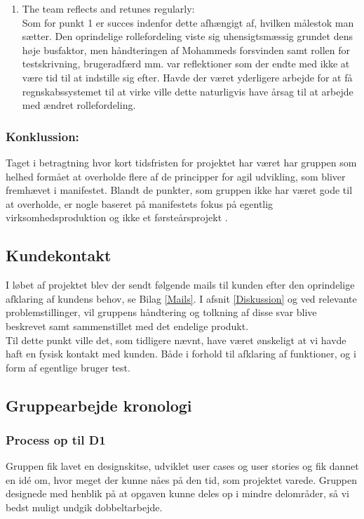 \documentclass[]{article}
\begin{document}
\begin{enumerate}
    \item The team reflects and retunes regularly:\\
Som for punkt 1 er succes indenfor dette afhængigt af, hvilken målestok man sætter. Den oprindelige rollefordeling viste sig uhensigtsmæssig grundet dens høje busfaktor, men håndteringen af Mohammeds forsvinden samt rollen for testskrivning, brugeradfærd mm. var reflektioner som der endte med ikke at være tid til at indstille sig efter. Havde der været yderligere arbejde for at få regnskabssystemet til at virke ville dette naturligvis have årsag til at arbejde med ændret rollefordeling.
\end{enumerate}

\subsubsection{Konklussion:}
Taget i betragtning hvor kort tidsfristen for projektet har været har gruppen som helhed formået at overholde flere af de principper for agil udvikling, som bliver fremhævet i manifestet. Blandt de punkter, som gruppen ikke har været gode til at overholde, er nogle baseret på manifestets fokus på egentlig virksomhedsproduktion og ikke et førsteårsprojekt .

\subsection{Kundekontakt}

I løbet af projektet blev der sendt følgende mails til kunden efter den oprindelige afklaring af kundens behov, se Bilag \ref{Mails}. I afsnit \ref{Diskussion} og ved relevante problemstillinger, vil gruppens håndtering og tolkning af disse svar blive beskrevet samt sammenstillet med det endelige produkt. \\
Til dette punkt ville det, som tidligere nævnt, have været ønskeligt at vi havde haft en fysisk kontakt med kunden. Både i forhold til afklaring af funktioner, og i form af egentlige bruger test.

\subsection{Gruppearbejde kronologi}

\subsubsection{Process op til D1}
Gruppen fik lavet en designskitse, udviklet user cases og user stories og fik dannet en idé om, hvor meget der kunne nåes på den tid, som projektet varede. Gruppen designede med henblik på at opgaven kunne deles op i mindre delområder, så vi bedst muligt undgik dobbeltarbejde.
\end{document}

